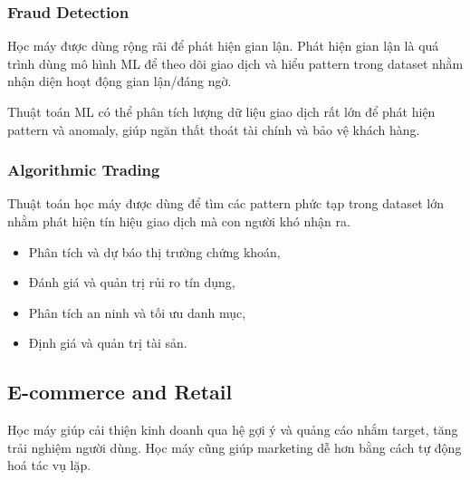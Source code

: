 \subsubsection{Fraud Detection}
\begin{ynghia}[title={Phát hiện gian lận}]
Học máy được dùng rộng rãi để phát hiện gian lận.
Phát hiện gian lận là quá trình dùng mô hình ML để theo dõi giao dịch và hiểu pattern trong dataset nhằm nhận diện hoạt động gian lận/đáng ngờ.
\end{ynghia}

\begin{ynghia}[title={Lợi ích}]
Thuật toán ML có thể phân tích lượng dữ liệu giao dịch rất lớn để phát hiện pattern và anomaly, giúp ngăn thất thoát tài chính và bảo vệ khách hàng.
\end{ynghia}

\subsubsection{Algorithmic Trading}
\begin{ynghia}[title={Giao dịch thuật toán}]
Thuật toán học máy được dùng để tìm các pattern phức tạp trong dataset lớn nhằm phát hiện tín hiệu giao dịch mà con người khó nhận ra.
\end{ynghia}

\begin{phuongphap}[title={Các ứng dụng tài chính khác}]
\begin{itemize}
  \item Phân tích và dự báo thị trường chứng khoán,
  \item Đánh giá và quản trị rủi ro tín dụng,
  \item Phân tích an ninh và tối ưu danh mục,
  \item Định giá và quản trị tài sản.
\end{itemize}
\end{phuongphap}

\subsection{E-commerce and Retail}

\begin{dongco}[title={ML trong thương mại điện tử/bán lẻ}]
Học máy giúp cải thiện kinh doanh qua hệ gợi ý và quảng cáo nhắm target, tăng trải nghiệm người dùng.
Học máy cũng giúp marketing dễ hơn bằng cách tự động hoá tác vụ lặp.
\end{dongco}

